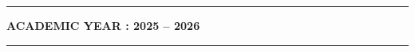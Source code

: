 \begin{titlepage}
\vfill

\textcolor{titleblue}{\rule{\textwidth}{0.8pt}}
\vspace{4pt}
\begin{center}
  {\fontsize{11pt}{13pt}\selectfont\textbf{\textcolor{titleblue}{ACADEMIC YEAR : 2025 -- 2026}}}
\end{center}
\vspace{6pt}
\textcolor{titleblue}{\rule{\textwidth}{2.5pt}}

\end{titlepage}
